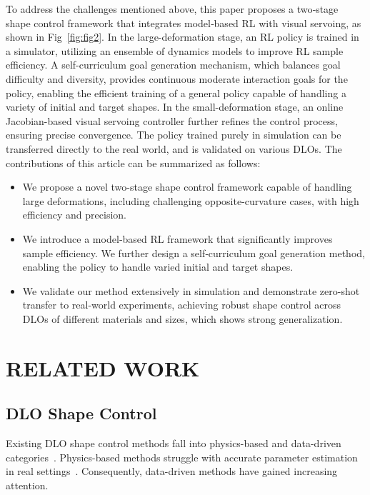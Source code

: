 \documentclass[letterpaper, 10 pt, conference]{ieeeconf}  %
\begin{document}
To address the challenges mentioned above, this paper proposes a two‑stage shape control framework that integrates model‑based RL with visual servoing, as shown in Fig~\ref{fig:fig2}. In the large-deformation stage, an RL policy is trained in a simulator, utilizing an ensemble of dynamics models to improve RL sample efficiency. A self-curriculum goal generation mechanism, which balances goal difficulty and diversity, provides continuous moderate interaction goals for the policy, enabling the efficient training of a general policy capable of handling a variety of initial and target shapes. In the small-deformation stage, an online Jacobian-based visual servoing controller further refines the control process, ensuring precise convergence. The policy trained purely in simulation can be transferred directly to the real world, and is validated on various DLOs. The contributions of this article can be summarized as follows:

\begin{itemize}
    \item We propose a novel two-stage shape control framework capable of handling large deformations, including challenging opposite-curvature cases, with high efficiency and precision.
    \item We introduce a model‑based RL framework that significantly improves sample efficiency. We further design a self‑curriculum goal generation method, enabling the policy to handle varied initial and target shapes.
    \item We validate our method extensively in simulation and demonstrate zero-shot transfer to real-world experiments, achieving robust shape control across DLOs of different materials and sizes, which shows strong generalization.
\end{itemize}


\section{RELATED WORK}

\subsection{DLO Shape Control}

Existing DLO shape control methods fall into physics-based and data-driven categories~\cite{yu2022global}. Physics-based methods struggle with accurate parameter estimation in real settings~\cite{wu2024optimization}. Consequently, data-driven methods have gained increasing attention.
\end{document}
